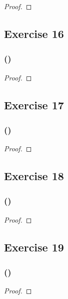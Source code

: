 \documentclass[14pt]{extarticle}
\begin{document}
\begin{proof}

\end{proof}

\subsection{Exercise 16}

\subsubsection{()}

\begin{proof}

\end{proof}

\subsection{Exercise 17}

\subsubsection{()}

\begin{proof}

\end{proof}

\subsection{Exercise 18}

\subsubsection{()}

\begin{proof}

\end{proof}

\subsection{Exercise 19}

\subsubsection{()}

\begin{proof}

\end{proof}
\end{document}
